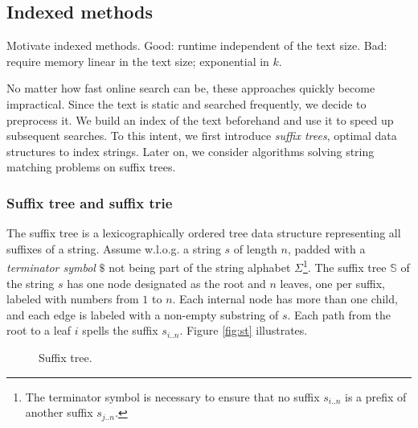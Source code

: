 
\subsection{Indexed methods}

Motivate indexed methods.
Good: runtime independent of the text size.
Bad: require memory linear in the text size; exponential in $k$.

No matter how fast online search can be, these approaches quickly become impractical.
Since the text is static and searched frequently, we decide to preprocess it.
We build an index of the text beforehand and use it to speed up subsequent searches.
To this intent, we first introduce \emph{suffix trees}, optimal data structures to index strings.
Later on, we consider algorithms solving string matching problems on suffix trees.

\subsubsection{Suffix tree and suffix trie}

The suffix tree \citep{Morrison1968} is a lexicographically ordered tree data structure representing all suffixes of a string.
Assume w.l.o.g. a string $s$ of length $n$, padded with a \emph{terminator symbol} $\$$ not being part of the string alphabet $\Sigma$\footnote{The terminator symbol is necessary to ensure that no suffix $s_{i..n}$ is a prefix of another suffix $s_{j..n}$.}.
The suffix tree $\mathbb{S}$ of the string $s$ has one node designated as the root and $n$ leaves, one per suffix, labeled with numbers from $1$ to $n$.
Each internal node has more than one child, and each edge is labeled with a non-empty substring of $s$.
Each path from the root to a leaf $i$ spells the suffix $s_{i..n}$.
Figure \ref{fig:st} illustrates.

\begin{figure}[h]
\caption{Suffix tree.}
\label{fig:stree}
\end{figure}


%

